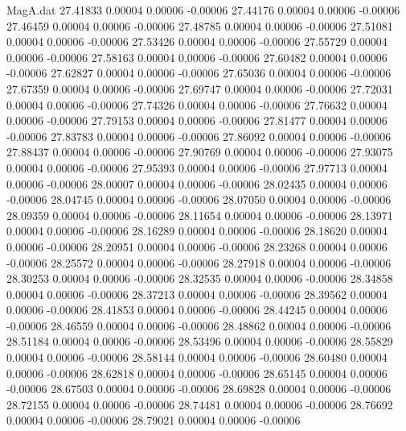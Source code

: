 \begin{filecontents}{MagA.dat}
  27.41833    0.00004    0.00006   -0.00006
  27.44176    0.00004    0.00006   -0.00006
  27.46459    0.00004    0.00006   -0.00006
  27.48785    0.00004    0.00006   -0.00006
  27.51081    0.00004    0.00006   -0.00006
  27.53426    0.00004    0.00006   -0.00006
  27.55729    0.00004    0.00006   -0.00006
  27.58163    0.00004    0.00006   -0.00006
  27.60482    0.00004    0.00006   -0.00006
  27.62827    0.00004    0.00006   -0.00006
  27.65036    0.00004    0.00006   -0.00006
  27.67359    0.00004    0.00006   -0.00006
  27.69747    0.00004    0.00006   -0.00006
  27.72031    0.00004    0.00006   -0.00006
  27.74326    0.00004    0.00006   -0.00006
  27.76632    0.00004    0.00006   -0.00006
  27.79153    0.00004    0.00006   -0.00006
  27.81477    0.00004    0.00006   -0.00006
  27.83783    0.00004    0.00006   -0.00006
  27.86092    0.00004    0.00006   -0.00006
  27.88437    0.00004    0.00006   -0.00006
  27.90769    0.00004    0.00006   -0.00006
  27.93075    0.00004    0.00006   -0.00006
  27.95393    0.00004    0.00006   -0.00006
  27.97713    0.00004    0.00006   -0.00006
  28.00007    0.00004    0.00006   -0.00006
  28.02435    0.00004    0.00006   -0.00006
  28.04745    0.00004    0.00006   -0.00006
  28.07050    0.00004    0.00006   -0.00006
  28.09359    0.00004    0.00006   -0.00006
  28.11654    0.00004    0.00006   -0.00006
  28.13971    0.00004    0.00006   -0.00006
  28.16289    0.00004    0.00006   -0.00006
  28.18620    0.00004    0.00006   -0.00006
  28.20951    0.00004    0.00006   -0.00006
  28.23268    0.00004    0.00006   -0.00006
  28.25572    0.00004    0.00006   -0.00006
  28.27918    0.00004    0.00006   -0.00006
  28.30253    0.00004    0.00006   -0.00006
  28.32535    0.00004    0.00006   -0.00006
  28.34858    0.00004    0.00006   -0.00006
  28.37213    0.00004    0.00006   -0.00006
  28.39562    0.00004    0.00006   -0.00006
  28.41853    0.00004    0.00006   -0.00006
  28.44245    0.00004    0.00006   -0.00006
  28.46559    0.00004    0.00006   -0.00006
  28.48862    0.00004    0.00006   -0.00006
  28.51184    0.00004    0.00006   -0.00006
  28.53496    0.00004    0.00006   -0.00006
  28.55829    0.00004    0.00006   -0.00006
  28.58144    0.00004    0.00006   -0.00006
  28.60480    0.00004    0.00006   -0.00006
  28.62818    0.00004    0.00006   -0.00006
  28.65145    0.00004    0.00006   -0.00006
  28.67503    0.00004    0.00006   -0.00006
  28.69828    0.00004    0.00006   -0.00006
  28.72155    0.00004    0.00006   -0.00006
  28.74481    0.00004    0.00006   -0.00006
  28.76692    0.00004    0.00006   -0.00006
  28.79021    0.00004    0.00006   -0.00006

\end{filecontents}
